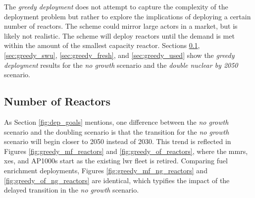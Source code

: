 
The \textit{greedy deployment} does not attempt to capture the complexity of the deployment problem but rather to explore the implications of deploying a certain number of reactors. The scheme could mirror large actors in a market, but is likely not realistic. The scheme will deploy reactors until the demand is met within the amount of the smallest capacity reactor. Sections \ref{sec:greedy_reactors}, \ref{sec:greedy_swu}, \ref{sec:greedy_fresh}, and \ref{sec:greedy_used} show the \textit{greedy deployment} results for the \textit{no growth} scenario and the \textit{double nuclear by 2050} scenario.

\subsection{Number of Reactors}
\label{sec:greedy_reactors}

As Section \ref{fig:dep_goals} mentions, one difference between the \textit{no growth} scenario and the doubling scenario is that the transition for the \textit{no growth} scenario will begin closer to 2050 instead of 2030. This trend is reflected in Figures \ref{fig:greedy_mf_reactors} and \ref{fig:greedy_of_reactors}, where the \glspl{mmr}, \glspl{xe}, and AP1000s start as the existing \gls{lwr} fleet is retired. Comparing fuel enrichment deployments, Figures \ref{fig:greedy_mf_ng_reactors} and \ref{fig:greedy_of_ng_reactors} are identical, which typifies the impact of the delayed transition in the \textit{no growth} scenario.


